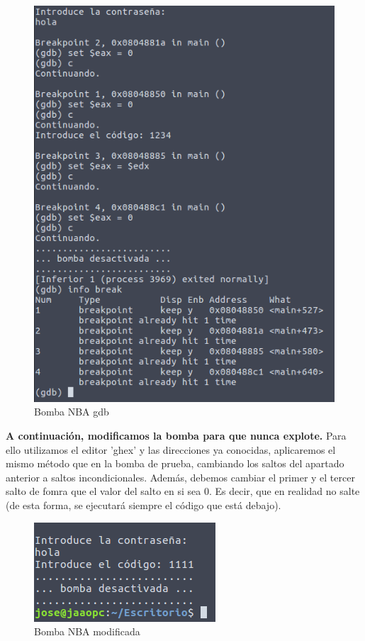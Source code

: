 \documentclass[11pt,a4paper]{article}
\begin{document}
\begin{figure}[H] 
	\centering
	\includegraphics[scale=0.45]{capturas/nba2.png} 
	\caption{Bomba NBA gdb} \label{fig:figura25}
\end{figure}

\textbf{A continuación, modificamos la bomba para que nunca explote.}  Para ello utilizamos el editor 'ghex' y las direcciones ya conocidas, aplicaremos el mismo método que en la bomba de prueba, cambiando los saltos del apartado anterior a saltos incondicionales. Además, debemos cambiar el primer y el tercer salto de fomra que el valor del salto en si sea 0. Es decir, que en realidad no salte (de esta forma, se ejecutará siempre el código que está debajo). \\

\begin{figure}[H] 
	\centering
	\includegraphics[scale=0.45]{capturas/nba3.png} 
	\caption{Bomba NBA modificada} \label{fig:figura25}
\end{figure}
\end{document}
